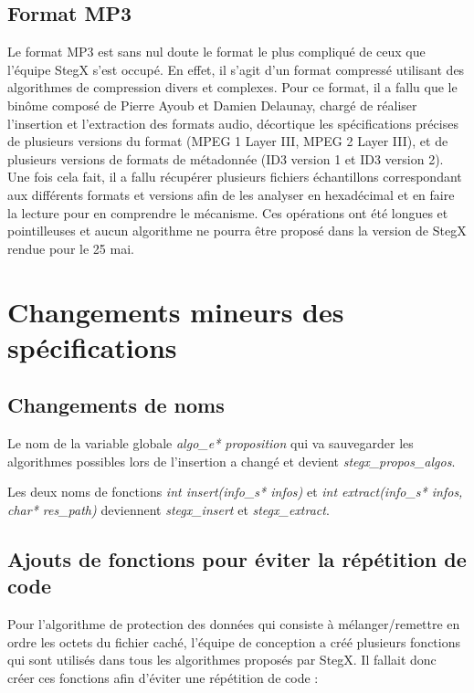 \documentclass[11pt]{article}
\begin{document}
\subsection{Format MP3}

Le format MP3 est sans nul doute le format le plus compliqué de ceux que
l'équipe StegX s'est occupé. En effet, il s'agit d'un format compressé utilisant
des algorithmes de compression divers et complexes. Pour ce format, il a fallu
que le binôme composé de Pierre Ayoub et Damien Delaunay, chargé de réaliser
l'insertion et l'extraction des formats audio, décortique les spécifications
précises de plusieurs versions du format (MPEG 1 Layer III, MPEG 2 Layer III),
et de plusieurs versions de formats de métadonnée (ID3 version 1 et ID3 version
2). Une fois cela fait, il a fallu récupérer plusieurs fichiers échantillons
correspondant aux différents formats et versions afin de les analyser en
hexadécimal et en faire la lecture pour en comprendre le mécanisme. Ces
opérations ont été longues et pointilleuses et aucun algorithme ne pourra être
proposé dans la version de StegX rendue pour le 25 mai. 

\section{Changements mineurs des spécifications}

\subsection{Changements de noms}

Le nom de la variable globale \textit{algo\_e* proposition} qui va sauvegarder 
les algorithmes possibles lors de l'insertion a changé et devient 
\textit{stegx\_propos\_algos}. 

Les deux noms de fonctions \textit{int insert(info\_s* infos)} et 
\textit{int extract(info\_s* infos, char* res\_path)} deviennent 
\textit{stegx\_insert} et \textit{stegx\_extract}. 

\subsection{Ajouts de fonctions pour éviter la répétition de code}

Pour l'algorithme de protection des données qui consiste à mélanger/remettre
en ordre les octets du fichier caché, l'équipe de conception a créé plusieurs 
fonctions qui sont utilisés dans tous les algorithmes proposés par StegX. 
Il fallait donc créer ces fonctions afin d'éviter une répétition de code :
 
\end{document}
